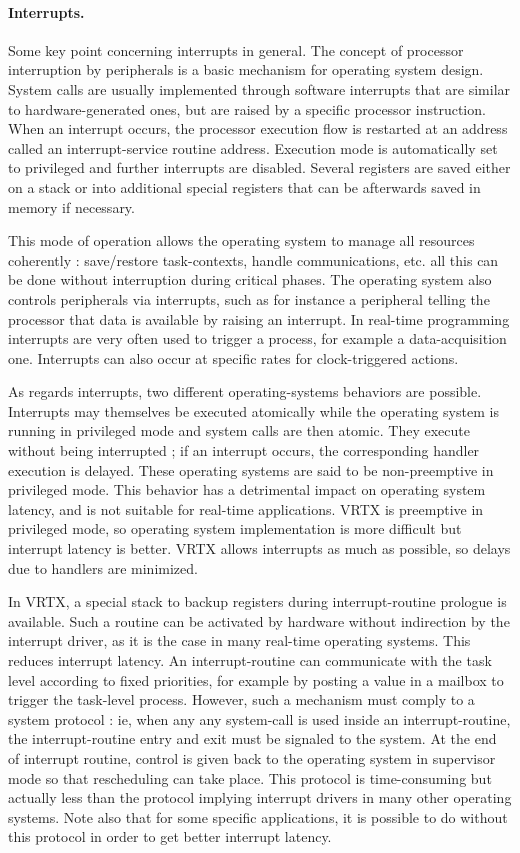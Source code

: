 \documentclass[10pt]{report}
\begin{document}
\paragraph{Interrupts.} Some key point concerning interrupts in general. The concept of 
processor interruption by peripherals is a basic mechanism for 
operating system design. System calls are usually implemented 
through software interrupts that are similar to 
hardware-generated ones, but are raised by a specific processor 
instruction. When an interrupt occurs, the processor execution 
flow is restarted at an address called an interrupt-service 
routine address. Execution mode is automatically set to 
privileged and further interrupts are disabled. Several registers 
are saved either on a stack or into additional special registers 
that can be afterwards saved in memory if necessary.

This mode of operation allows the operating system to manage all 
resources coherently : save/restore task-contexts, handle 
communications, etc. all this can be done without interruption 
during critical phases. The operating system also controls 
peripherals via interrupts, such as for instance a peripheral 
telling the processor that data is available by raising an 
interrupt. In real-time programming interrupts are very often 
used to trigger a process, for example a data-acquisition one. 
Interrupts can also occur at specific rates for clock-triggered 
actions.

As regards interrupts, two different operating-systems behaviors 
are possible. Interrupts may themselves be executed atomically while 
the operating system is running in privileged mode and system 
calls are then atomic. They execute without being interrupted ; 
if an interrupt occurs, the corresponding handler execution is 
delayed. These operating systems are said to be non-preemptive in 
privileged mode. This behavior has a detrimental impact on 
operating system latency, and is not suitable for real-time 
applications. VRTX is preemptive in privileged mode, so operating 
system implementation is more difficult but interrupt latency is 
better. VRTX allows interrupts as much as possible, so delays due 
to handlers are minimized.

In VRTX, a special stack to backup registers during 
interrupt-routine prologue is available. Such a routine can be 
activated by hardware without indirection by the interrupt 
driver, as it is the case in many real-time operating systems. 
This reduces interrupt latency. An interrupt-routine can 
communicate with the task level according to fixed priorities, 
for example by posting a value in a mailbox to trigger the 
task-level process. However, such a mechanism must comply to a 
system protocol : ie, when any any system-call is used inside an 
interrupt-routine, the interrupt-routine entry and exit must be 
signaled to the system. At the end of interrupt routine, control 
is given back to the operating system in supervisor mode so that 
rescheduling can take place. This protocol is time-consuming but 
actually less than the protocol implying interrupt drivers in 
many other operating systems. Note also that for some specific 
applications, it is possible to do without this protocol in order 
to get better interrupt latency.
\end{document}
